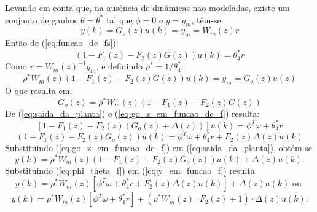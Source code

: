     Levando em conta que, na ausência de dinâmicas não modeladas, existe um conjunto de ganhos $\theta = \theta^*$ tal que $\phi = 0$ e $y = y_m$, têm-se:
    \begin{equation}
        y(k) = G_o(z) u(k) = y_m = W_m(z) r
    \end{equation}
    Então de (\ref{eq:funcao_de_fs}):
    \begin{equation}
        \left( 1 - F_1(z) - F_2(z) G(z) \right) u(k) = \theta_4^* r
    \end{equation}
    Como $r = W_m(z)^{-1} y_m$, e definindo $\rho^* = 1/\theta_4^*$:
    \begin{equation*}
        \rho^* W_m(z) \left( 1 - F_1(z) - F_2(z) G(z) \right) u(k) = y_m = G_o(z) u(z)
    \end{equation*}
    O que resulta em:
    \begin{equation}
        G_o(z) = \rho^* W_m(z) \left( 1 - F_1(z) - F_2(z) G(z) \right)
        \label{eq:go_z_em_funcao_de_f}
    \end{equation}
    De (\ref{eq:saida_da_planta}) e (\ref{eq:go_z_em_funcao_de_f}) resulta:
    \begin{equation*}
        \left[ 1 - F_1(z) - F_2(z) \left( G_o(z) + \Delta(z) \right)
            \right] u(k) = \phi^T \omega + \theta_4^* r
    \end{equation*}
    \begin{equation}
        \left( 1 - F_1(z) - F_2(z) G_o(z) \right) u(k) = \phi^T \omega +
            \theta_4^* r + F_2(z) \Delta(z) u(k)
        \label{eq:phi_theta_f}
    \end{equation}
    Substituindo (\ref{eq:go_z_em_funcao_de_f}) em (\ref{eq:saida_da_planta}), obtém-se
    \begin{equation}
        y(k) = \rho^* W_m(z) \left( 1 - F_1(z) - F_2(z) G_o(z)
            \right) u(k) + \Delta(z) u(k) \text{.}
        \label{eq:y_em_funcao_f}
    \end{equation}
    Substituindo (\ref{eq:phi_theta_f}) em (\ref{eq:y_em_funcao_f}) resulta
    \begin{equation*}
        y(k) = \rho^* W_m(z) \left[ \phi^T \omega + \theta_4^* r + F_2(z)
            \Delta(z) u(k) \right] + \Delta(z) u(k) \text{ ou }
    \end{equation*}
    \begin{equation*}
        y(k) = \rho^* W_m(z) \left[ \phi^T \omega + \theta_4^* r
            \right] + \left( \rho^* W_m(z) \cdot F_2(z) + 1
            \right) \cdot \Delta(z) u(k) \text{.}
    \end{equation*}
